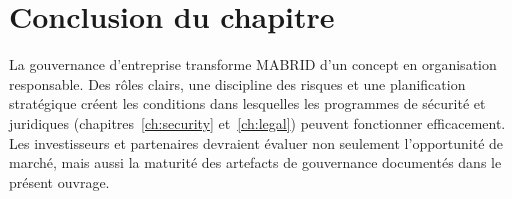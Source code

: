 \section{Conclusion du chapitre}

La gouvernance d'entreprise transforme MABRID d'un concept en organisation responsable. Des rôles clairs, une discipline des risques et une planification stratégique créent les conditions dans lesquelles les programmes de sécurité et juridiques (chapitres~\ref{ch:security} et~\ref{ch:legal}) peuvent fonctionner efficacement. Les investisseurs et partenaires devraient évaluer non seulement l'opportunité de marché, mais aussi la maturité des artefacts de gouvernance documentés dans le présent ouvrage.
